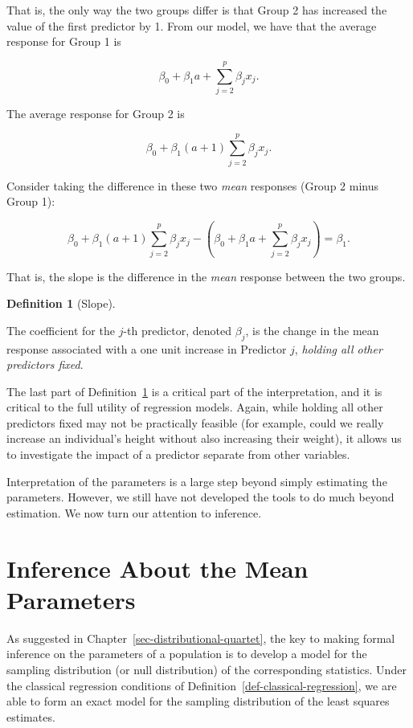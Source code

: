 \documentclass[
  letterpaper,
  DIV=11,
  numbers=noendperiod]{scrreprt}
\theoremstyle{definition}
\newtheorem{definition}{Definition}[chapter]
\theoremstyle{definition}
\theoremstyle{remark}
\begin{document}
That is, the only way the two groups differ is that Group 2 has
increased the value of the first predictor by 1. From our model, we have
that the average response for Group 1 is

\[\beta_0 + \beta_1 a + \sum_{j=2}^{p} \beta_j x_j.\]

The average response for Group 2 is

\[\beta_0 + \beta_1 (a + 1) \sum_{j=2}^{p} \beta_j x_j.\]

Consider taking the difference in these two \emph{mean} responses (Group
2 minus Group 1):

\[\beta_0 + \beta_1 (a + 1) \sum_{j=2}^{p} \beta_j x_j - \left(\beta_0 + \beta_1 a + \sum_{j=2}^{p} \beta_j x_j\right) = \beta_1.\]

That is, the slope is the difference in the \emph{mean} response between
the two groups.

\begin{definition}[Slope]\protect\hypertarget{def-slope}{}\label{def-slope}

The coefficient for the \(j\)-th predictor, denoted \(\beta_j\), is the
change in the mean response associated with a one unit increase in
Predictor \(j\), \emph{holding all other predictors fixed}.

\end{definition}

The last part of Definition~\ref{def-slope} is a critical part of the
interpretation, and it is critical to the full utility of regression
models. Again, while holding all other predictors fixed may not be
practically feasible (for example, could we really increase an
individual's height without also increasing their weight), it allows us
to investigate the impact of a predictor separate from other variables.

Interpretation of the parameters is a large step beyond simply
estimating the parameters. However, we still have not developed the
tools to do much beyond estimation. We now turn our attention to
inference.

\hypertarget{inference-about-the-mean-parameters}{%
\section{Inference About the Mean
Parameters}\label{inference-about-the-mean-parameters}}

As suggested in Chapter~\ref{sec-distributional-quartet}, the key to
making formal inference on the parameters of a population is to develop
a model for the sampling distribution (or null distribution) of the
corresponding statistics. Under the classical regression conditions of
Definition~\ref{def-classical-regression}, we are able to form an exact
model for the sampling distribution of the least squares estimates.
\end{document}
